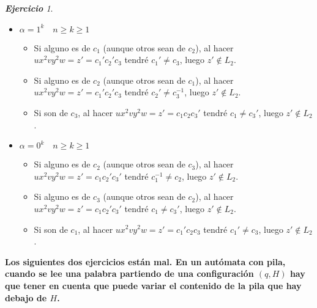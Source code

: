 \documentclass[12pt,spanish]{article}
\theoremstyle{definition}
\theoremstyle{remark}
\newtheorem{exercise}{\textbf{Ejercicio}}%
\begin{document}
\begin{exercise}
\begin{itemize}
  \item $\alpha = 1^k \quad n \geq k\geq 1$
    \begin{itemize}
    \item Si alguno es de $c_1$ (aunque otros sean de $c_2$), al hacer
      $ux^2vy^2w=z'=c_1'c_2'c_3$ tendré $c_1'\neq c_3$, luego
      $z' \notin L_2$.
    \item Si alguno es de $c_2$ (aunque otros sean de $c_1$), al hacer
      $ux^2vy^2w=z'=c_1'c_2'c_3$ tendré $c_2'\neq c_3^{-1}$, luego
      $z' \notin L_2$.
    \item Si son de $c_3$, al hacer $ux^2vy^2w=z'=c_1c_2c_3'$ tendré
      $c_1\neq c_3'$, luego $z' \notin L_2$.
    \end{itemize}

    \item $\alpha = 0^k \quad n \geq k\geq 1$
    \begin{itemize}
    \item Si alguno es de $c_2$ (aunque otros sean de $c_3$), al hacer
      $ux^2vy^2w=z'=c_1c_2'c_3'$ tendré $c_1^{-1}\neq c_2$, luego
      $z' \notin L_2$.
    \item Si alguno es de $c_3$ (aunque otros sean de $c_2$), al hacer
      $ux^2vy^2w=z'=c_1c_2'c_3'$ tendré $c_1\neq c_3'$, luego
      $z' \notin L_2$.
    \item Si son de $c_1$, al hacer $ux^2vy^2w=z'=c_1'c_2c_3$ tendré
      $c_1'\neq c_3$, luego $z' \notin L_2$.
    \end{itemize}
  \end{itemize}
\end{exercise}

\newpage

\textbf{Los siguientes dos ejercicios están mal. En un autómata con
  pila, cuando se lee una palabra partiendo de una configuración
  $(q,H)$ hay que tener en cuenta que puede variar el contenido de la
  pila que hay debajo de $H$.}

\setcounter{exercise}{20}
\end{document}
